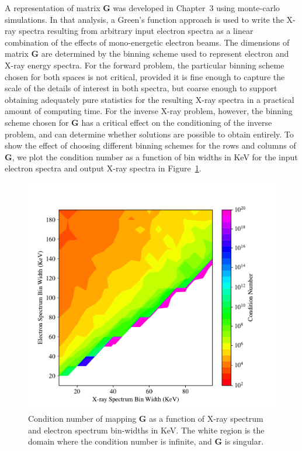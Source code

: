 A representation of matrix $\mathbf{G}$ was developed in Chapter~3 using monte-carlo simulations. In that analysis, a Green's function approach is used to write the X-ray spectra resulting from arbitrary input electron spectra as a linear combination of the effects of mono-energetic electron beams. The dimensions of matrix $\mathbf{G}$ are determined by the binning scheme used to represent electron and X-ray energy spectra. For the forward problem, the particular binning scheme chosen for both spaces is not critical, provided it is fine enough to capture the scale of the details of interest in both spectra, but coarse enough to support obtaining adequately pure statistics for the resulting X-ray spectra in a practical amount of computing time. For the inverse X-ray problem, however, the binning scheme chosen for $\mathbf{G}$ has a critical effect on the conditioning of the inverse problem, and can determine whether solutions are possible to obtain entirely. To show the effect of choosing different binning schemes for the rows and columns of $\mathbf{G}$, we plot the condition number as a function of bin widths in KeV for the input electron spectra and output X-ray spectra in Figure~\ref{condition_number_binning}. 

\begin{figure}[p]
\label{condition_number_binning}
\centering
\includegraphics[width=1.0\textwidth]{figures/chapter_4/condition_number_binning/condition_number_binning.pdf}
\caption{Condition number of mapping $\mathbf{G}$ as a function of X-ray spectrum and electron spectrum bin-widths in KeV. The white region is the domain where the condition number is infinite, and $\mathbf{G}$ is singular.}
\end{figure}

